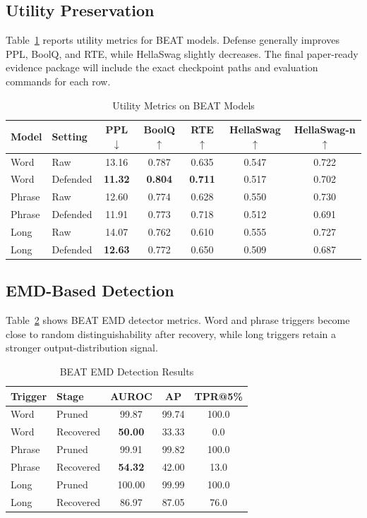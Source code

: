 \documentclass[lettersize,journal]{IEEEtran}
\begin{document}
\subsection{Utility Preservation}
Table~\ref{tab:utility} reports utility metrics for BEAT models. Defense generally improves PPL, BoolQ, and RTE, while HellaSwag slightly decreases. The final paper-ready evidence package will include the exact checkpoint paths and evaluation commands for each row.

\begin{table}[!t]
\caption{Utility Metrics on BEAT Models}
\label{tab:utility}
\centering
\begin{tabular}{llccccc}
\hline
Model & Setting & PPL$\downarrow$ & BoolQ$\uparrow$ & RTE$\uparrow$ & HellaSwag$\uparrow$ & HellaSwag-n$\uparrow$ \\
\hline
Word & Raw & 13.16 & 0.787 & 0.635 & 0.547 & 0.722 \\
Word & Defended & \textbf{11.32} & \textbf{0.804} & \textbf{0.711} & 0.517 & 0.702 \\
Phrase & Raw & 12.60 & 0.774 & 0.628 & 0.550 & 0.730 \\
Phrase & Defended & 11.91 & 0.773 & 0.718 & 0.512 & 0.691 \\
Long & Raw & 14.07 & 0.762 & 0.610 & 0.555 & 0.727 \\
Long & Defended & \textbf{12.63} & 0.772 & 0.650 & 0.509 & 0.687 \\
\hline
\end{tabular}
\end{table}

\subsection{EMD-Based Detection}
Table~\ref{tab:emd} shows BEAT EMD detector metrics. Word and phrase triggers become close to random distinguishability after recovery, while long triggers retain a stronger output-distribution signal.

\begin{table}[!t]
\caption{BEAT EMD Detection Results}
\label{tab:emd}
\centering
\begin{tabular}{llccc}
\hline
Trigger & Stage & AUROC & AP & TPR@5\% \\
\hline
Word & Pruned & 99.87 & 99.74 & 100.0 \\
Word & Recovered & \textbf{50.00} & 33.33 & 0.0 \\
Phrase & Pruned & 99.91 & 99.82 & 100.0 \\
Phrase & Recovered & \textbf{54.32} & 42.00 & 13.0 \\
Long & Pruned & 100.00 & 99.99 & 100.0 \\
Long & Recovered & 86.97 & 87.05 & 76.0 \\
\hline
\end{tabular}
\end{table}
\end{document}
